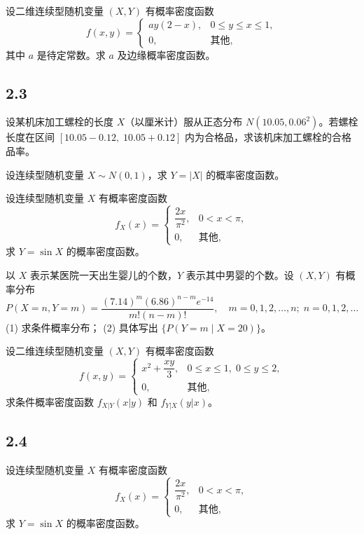\begin{homework}[30]
设二维连续型随机变量 $(X,Y)$ 有概率密度函数
\[
f(x,y) =
\begin{cases}
a y (2 - x), & 0 \le y \le x \le 1, \\[6pt]
0, & \text{其他},
\end{cases}
\]
其中 $a$ 是待定常数。求 $a$ 及边缘概率密度函数。
\end{homework}
\subsection{2.3}
\begin{homework}[2.31]
设某机床加工螺栓的长度 $X$（以厘米计）服从正态分布 $N(10.05, 0.06^2)$。若螺栓长度在区间 $[10.05-0.12,\; 10.05+0.12]$ 内为合格品，求该机床加工螺栓的合格品率。
\end{homework}

\begin{homework}[2.34]
设连续型随机变量 $X \sim N(0,1)$，求 $Y = |X|$ 的概率密度函数。
\end{homework}

\begin{homework}[2.35]
设连续型随机变量 $X$ 有概率密度函数
\[
f_X(x) =
\begin{cases}
\dfrac{2x}{\pi^2}, & 0 < x < \pi, \\[6pt]
0, & \text{其他},
\end{cases}
\]
求 $Y = \sin X$ 的概率密度函数。
\end{homework}

\begin{homework}[2.37]
以 $X$ 表示某医院一天出生婴儿的个数，$Y$ 表示其中男婴的个数。设 $(X,Y)$ 有概率分布
\[
P(X = n, Y = m) = \frac{(7.14)^m (6.86)^{n-m} e^{-14}}{m!(n-m)!}, 
\quad m = 0,1,2,\ldots,n; \; n = 0,1,2,\ldots
\]
(1) 求条件概率分布；  
(2) 具体写出 $\{ P(Y = m \mid X = 20) \}$。
\end{homework}

\begin{homework}[2.39]
设二维连续型随机变量 $(X,Y)$ 有概率密度函数
\[
f(x,y) =
\begin{cases}
x^2 + \dfrac{xy}{3}, & 0 \leq x \leq 1, \; 0 \leq y \leq 2, \\[6pt]
0, & \text{其他},
\end{cases}
\]
求条件概率密度函数 $f_{X|Y}(x|y)$ 和 $f_{Y|X}(y|x)$。
\end{homework}
\subsection{2.4}
\begin{homework}[2.42]
设连续型随机变量 $X$ 有概率密度函数
\[
f_X(x) =
\begin{cases}
\dfrac{2x}{\pi^2}, & 0 < x < \pi,\\[6pt]
0, & \text{其他},
\end{cases}
\]
求 $Y = \sin X$ 的概率密度函数。
\end{homework}

